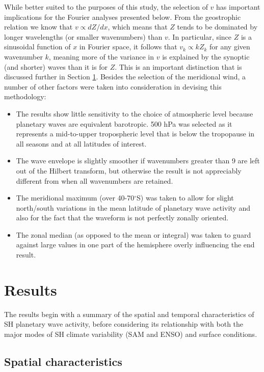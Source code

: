 While better suited to the purposes of this study, the selection of $v$ has important implications for the Fourier analyses presented below. From the geostrophic relation we know that $v \propto dZ / dx$, which means that $Z$ tends to be dominated by longer wavelengths (or smaller wavenumbers) than $v$. In particular, since $Z$ is a sinusoidal function of $x$ in Fourier space, it follows that $v_k \propto k Z_k$ for any given wavenumber $k$, meaning more of the variance in $v$ is explained by the synoptic (and shorter) waves than it is for $Z$. This is an important distinction that is discussed further in Section \ref{s:zw_results}. Besides the selection of the meridional wind, a number of other factors were taken into consideration in devising this methodology:
\begin{itemize}
\item The results show little sensitivity to the choice of atmospheric level because planetary waves are equivalent barotropic. 500 hPa was selected as it represents a mid-to-upper tropospheric level that is below the tropopause in all seasons and at all latitudes of interest.
\item The wave envelope is slightly smoother if wavenumbers greater than 9 are left out of the Hilbert transform, but otherwise the result is not appreciably different from when all wavenumbers are retained.
\item The meridional maximum (over 40-70$^{\circ}$S) was taken to allow for slight north/south variations in the mean latitude of planetary wave activity and also for the fact that the waveform is not perfectly zonally oriented. 
\item The zonal median (as opposed to the mean or integral) was taken to guard against large values in one part of the hemisphere overly influencing the end result.
\end{itemize}

      

\section{Results}\label{s:zw_results}

The results begin with a summary of the spatial and temporal characteristics of SH planetary wave activity, before considering its relationship with both the major modes of SH climate variability (SAM and ENSO) and surface conditions. 


\subsection{Spatial characteristics}\label{s:spatial_characteristics}

